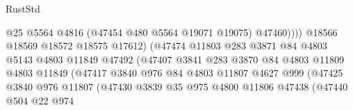 \begin{lexlean}{RustStd}
\begin{coremodule}
                                                @25
                                                @5564
                                                @4816
                                                (@47454 @480 @5564 @19071 @19075)
                                                @47460))))
                                        @18566
                                        @18569
                                        @18572
                                        @18575
                                        @17612)
                                      (@47474
                                        @11803
                                        @283
                                        @3871
                                        @84
                                        @4803
                                        @5143
                                        @4803
                                        @11849
                                        @47492
                                        (@47407
                                          @3841
                                          @283
                                          @3870
                                          @84
                                          @4803
                                          @11809
                                          @4803
                                          @11849
                                          (@47417
                                            @3840
                                            @976
                                            @84
                                            @4803
                                            @11807
                                            @4627
                                            @999
                                            (@47425
                                              @3840
                                              @976
                                              @11807
                                              (@47430
                                                @3839
                                                @35
                                                @975
                                                @4800
                                                @11806
                                                @47438
                                                (@47440
                                                  @504
                                                  @22
                                                  @974

\end{coremodule}
\end{lexlean}
